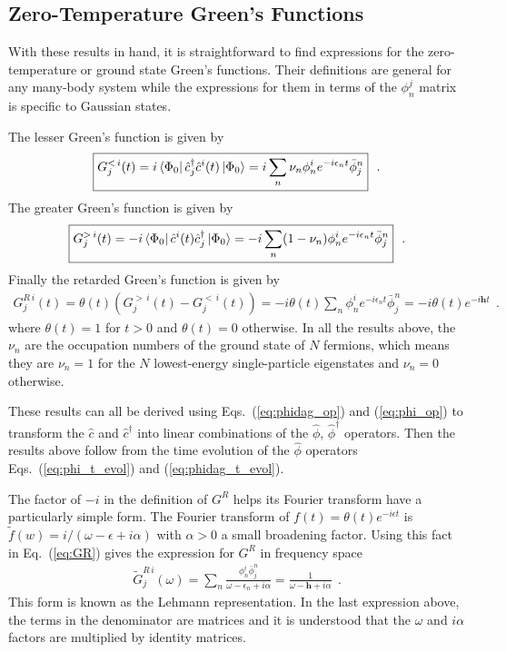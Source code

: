 \documentclass[aps, superscriptaddress, floatfix, onecolumn]{revtex4-2}
\begin{document}
\subsection{Zero-Temperature Green's Functions}

With these results in hand, it is straightforward to find expressions for the zero-temperature or ground state Green's functions. 
Their definitions are general for any many-body system while the expressions for them in terms of the $\phi^j_n$ matrix is specific to Gaussian states.

The lesser Green's function is given by
\begin{align}
\boxed{G^{<\, i}_j(t)= i \bra{\Phi_0} \hat{c}^\dagger_j \hat{c}^i(t) \ket{\Phi_0}  = i \sum_n \nu_n  \phi^i_n e^{-i \epsilon_n t}  \bar{\phi}_j^n} \ \ .
\end{align}
The greater Green's function is given by
\begin{align}
\boxed{G^{>\, i}_j(t)= -i \bra{\Phi_0} \hat{c}^i(t) \hat{c}^\dagger_j \ket{\Phi_0} = -i \sum_n (1-\nu_n) \phi^i_n e^{-i \epsilon_n t} \bar{\phi}_j^n} \ \ .
\end{align}
Finally the retarded Green's function is given by
\begin{align}
\boxed{G^{R\, i}_j(t) = \theta(t)(G^{>\, i}_j(t) - G^{<\, i}_j(t)) = -i \theta(t) \sum_n \phi^i_n e^{-i \epsilon_n t} \bar{\phi}_j^n  = -i \theta(t) e^{-i \mathbf{h} t} } \ \ .  \label{eq:GR}
\end{align}
where $\theta(t) = 1$ for $t > 0$ and $\theta(t) = 0$ otherwise.
In all the results above, the $\nu_n$ are the occupation numbers of the ground state of $N$ fermions, which means they are $\nu_n = 1$ for the $N$ lowest-energy single-particle eigenstates and $\nu_n = 0$ otherwise.

These results can all be derived using Eqs.~(\ref{eq:phidag_op}) and (\ref{eq:phi_op}) to transform the $\hat{c}$ and $\hat{c}^\dagger$ into linear combinations of the $\hat{\phi}$, $\hat{\phi}^\dagger$ operators. Then the results above follow from the time evolution of the $\hat{\phi}$ operators Eqs.~(\ref{eq:phi_t_evol}) and (\ref{eq:phidag_t_evol}).

The factor of $-i$ in the definition of $G^R$ helps its Fourier transform have a particularly simple form. The Fourier transform of $f(t) = \theta(t) e^{-i \epsilon t}$ is $\tilde{f}(w) = i/(\omega - \epsilon + i \alpha)$ with $\alpha > 0$ a small broadening factor. Using this fact in Eq.~(\ref{eq:GR}) gives the expression for $G^R$ in frequency space
\begin{align}
\boxed{ \tilde{G}^{R\, i}_j(\omega)  = \sum_n \frac{\phi^i_n \bar{\phi}_j^n}{\omega - \epsilon_n + i \alpha} = \frac{1}{\omega - \mathbf{h} + i \alpha} } \ \ .
\end{align}
This form is known as the Lehmann representation. In the last expression above, the terms in the denominator are matrices and it is understood that the $\omega$ and $i \alpha$ factors are multiplied by identity matrices.
\end{document}
